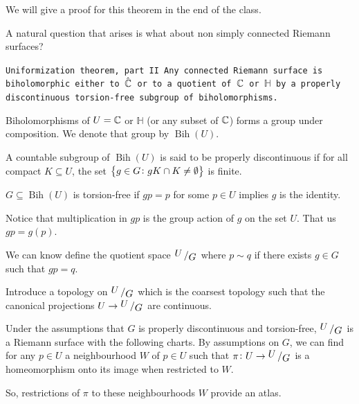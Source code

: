 \documentclass[11pt,a4paper]{article}
\DeclareMathOperator{\Bih}{Bih}
\renewcommand{\H}{\mathbb H}
\begin{document}
We will give a proof for this theorem in the end of the class.

A natural question that arises is what about non simply connected Riemann
surfaces?

\begin{theorem}\tt{Uniformization theorem, part II}
    Any connected Riemann surface is biholomorphic either to $\hat{\mathbb{C}}$
    or to a quotient of $\mathbb{C}$ or $\H$ by a properly discontinuous
    torsion-free subgroup of biholomorphisms.
\end{theorem}

\begin{remark}
    Biholomorphisms of $U = \mathbb{C}$ or $\H$ (or any subset of $\mathbb{C}$)
    forms a group under composition.
    We denote that group by $\Bih(U)$.
\end{remark}

\begin{definition}
    A countable subgroup of $\Bih(U)$ is said to be properly discontinuous
    if for all compact $K \subseteq U$, the set 
    $\left\{g \in G \colon gK \cap K \neq \emptyset\right\}$ is finite.
\end{definition}

\begin{definition}
    $G \subseteq \Bih(U)$ is torsion-free if $gp = p$ for some $p \in U$
    implies $g$ is the identity.
\end{definition}

\begin{remark}
  Notice that multiplication in $gp$ is the group action of $g$ on the 
  set $U$. That us $gp = g(p)$.
\end{remark}

We can know define the quotient space $\bigslant{U}{G}$ where
$p \sim q$ if there exists $g \in G$ such that $gp = q$.

Introduce a topology on $\bigslant{U}{G}$ which is the coarsest topology
such that the canonical projections $U \to \bigslant{U}{G}$ are continuous.

Under the assumptions that $G$ is properly discontinuous and torsion-free,
$\bigslant{U}{G}$ is a Riemann surface with the following charts.
By assumptions on $G$, we can find for any $p \in U$ a neighbourhood $W$ of
$p \in U$ such that $\pi \colon U \to \bigslant{U}{G}$ is a homeomorphism
onto its image when restricted to $W$.

So, restrictions of $\pi$ to these neighbourhoods $W$ provide an atlas.
\end{document}
